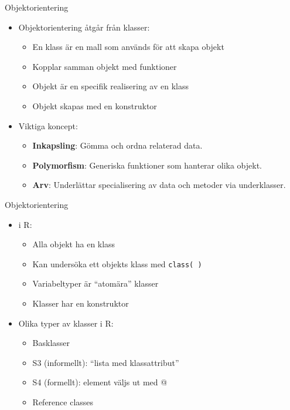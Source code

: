 \documentclass[
  11pt,
  ignorenonframetext,
  handout]{beamer}
\providecommand{\tightlist}{%
  \setlength{\itemsep}{0pt}\setlength{\parskip}{0pt}}
\begin{document}
\begin{frame}{Objektorientering}
\label{objektorientering}
\begin{itemize}
\tightlist
\item
  Objektorientering åtgår från klasser:

  \begin{itemize}
  \tightlist
  \item
    En klass är en mall som används för att skapa objekt
  \item
    Kopplar samman objekt med funktioner
  \item
    Objekt är en specifik realisering av en klass
  \item
    Objekt skapas med en konstruktor
  \end{itemize}
\item
  Viktiga koncept:

  \begin{itemize}
  \tightlist
  \item
    \textbf{Inkapsling}: Gömma och ordna relaterad data.
  \item
    \textbf{Polymorfism}: Generiska funktioner som hanterar olika
    objekt.
  \item
    \textbf{Arv}: Underlättar specialisering av data och metoder via
    underklasser.
  \end{itemize}
\end{itemize}
\end{frame}

\begin{frame}{Objektorientering}
\label{objektorientering-1}
\begin{itemize}
\tightlist
\item
  i R:

  \begin{itemize}
  \tightlist
  \item
    Alla objekt ha en klass
  \item
    Kan undersöka ett objekts klass med \texttt{class( )}
  \item
    Variabeltyper är ``atomära'' klasser
  \item
    Klasser har en konstruktor
  \end{itemize}
\item
  Olika typer av klasser i R:

  \begin{itemize}
  \tightlist
  \item
    Basklasser
  \item
    S3 (informellt): ``lista med klassattribut''
  \item
    S4 (formellt): element väljs ut med @
  \item
    Reference classes
  \end{itemize}
\end{itemize}
\end{frame}
\end{document}
